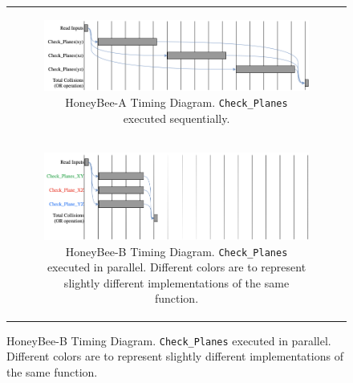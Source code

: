 \begin{figure}[H]
\begin{centering}
\begin{tabular}{c}

\begin{subfigure}{\linewidth}
\includegraphics[width=\linewidth]{chapters/chapter3/img/timing1.png}
\caption{HoneyBee-A Timing Diagram. \texttt{Check\_Planes} executed sequentially.}
\label{fig:hbb_timing_a}
\end{subfigure} \\

\begin{subfigure}{\linewidth}
\includegraphics[width=\linewidth]{chapters/chapter3/img/timing2.png}
\caption{HoneyBee-B Timing Diagram. \texttt{Check\_Planes} executed in parallel. Different colors are to represent slightly different implementations of the same function.}
\label{fig:hbb_timing_b}
\end{subfigure} \\

\end{tabular}
\label{fig:hbb_timing}
\end{centering}
\end{figure}
